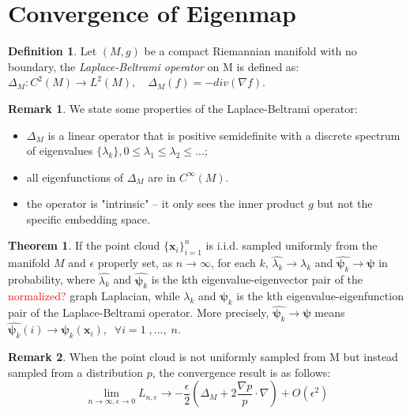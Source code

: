 \documentclass[11pt]{article}
\theoremstyle{definition}
\newtheorem{definition}{Definition}
\newtheorem{remark}{Remark}
\newtheorem{theorem}{Theorem}
\begin{document}
\section{Convergence of Eigenmap}
\begin{definition}
Let $(M, g)$ be a compact Riemannian manifold with no boundary, the \textit{Laplace-Beltrami operator} on M is defined as: $\Delta_M: C^2(M) \rightarrow L^2(M),\quad \Delta_M(f) = -div(\nabla f)$.
\end{definition}
\begin{remark}
We state some properties of the Laplace-Beltrami operator:
\begin{itemize}
\item $\Delta_M$ is a linear operator that is positive semidefinite with a discrete spectrum of eigenvalues $\{\lambda_k\}, 0 \leq \lambda_1 \leq \lambda_2 \leq ... $;
\item all eigenfunctions of $\Delta_M$ are in $C^\infty(M)$.
\item the operator is "intrinsic" -- it only sees the inner product $g$ but not the specific embedding space.
\end{itemize}
\end{remark}
\begin{theorem}
If the point cloud $\{\mathbf{x}_i\}_{i=1}^n$ is i.i.d. sampled uniformly from the manifold $M$ and $\epsilon$ properly set, as $n \rightarrow \infty$,  for each $k$,
$\widehat{\lambda_{k}} \rightarrow \lambda_{k}$ and $\widehat{\boldsymbol{\psi}_k} \rightarrow \boldsymbol{\psi}$ in probability, where $\widehat{\lambda_{k}}$ and $\widehat{\boldsymbol{\psi}_k}$ is the kth eigenvalue-eigenvector pair of the \textcolor{red}{normalized?} graph Laplacian, while $\lambda_{k}$ and $\boldsymbol{\psi}_k$ is the kth eigenvalue-eigenfunction pair of the Laplace-Beltrami operator. More precisely, $\widehat{\boldsymbol{\psi}_k} \rightarrow \boldsymbol{\psi}$ means $\widehat{\boldsymbol{\psi}_k}(i) \rightarrow \boldsymbol{\psi}_k(\boldsymbol{x}_i), \;\; \forall i=1 \; ,...,\; n$.
\end{theorem}
\begin{remark}
When the point cloud is not uniformly sampled from M but instead sampled from a distribution $p$, the convergence result is as follows:
\begin{equation}
\lim_{n\rightarrow \infty, \epsilon \rightarrow 0} L_{n,\epsilon} \rightarrow -\frac{\epsilon}{2}(\Delta_M + 2\frac{\nabla p}{p} \cdot \nabla) + O(\epsilon^2)
\end{equation}
\end{remark}
\end{document}
